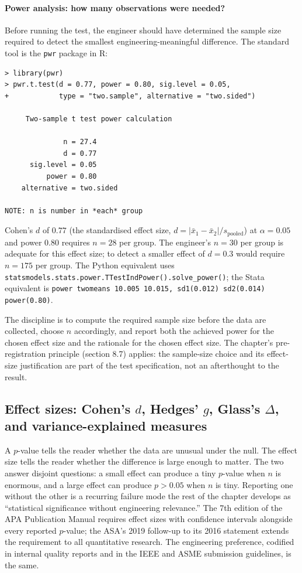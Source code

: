 \paragraph{Power analysis: how many observations were needed?}
Before running the test, the engineer should have determined the
sample size required to detect the smallest engineering-meaningful
difference. The standard tool is the \texttt{pwr} package in R:

\begin{verbatim}
> library(pwr)
> pwr.t.test(d = 0.77, power = 0.80, sig.level = 0.05,
+            type = "two.sample", alternative = "two.sided")

     Two-sample t test power calculation

              n = 27.4
              d = 0.77
      sig.level = 0.05
          power = 0.80
    alternative = two.sided

NOTE: n is number in *each* group
\end{verbatim}

\noindent
Cohen's $d$ of $0.77$ (the standardised effect size,
$d = |\bar{x}_{1} - \bar{x}_{2}|/s_{\text{pooled}}$) at $\alpha
= 0.05$ and power $0.80$ requires $n = 28$ per group. The
engineer's $n = 30$ per group is adequate for this effect size;
to detect a smaller effect of $d = 0.3$ would require $n = 175$
per group. The Python equivalent uses
\texttt{statsmodels.stats.power.TTestIndPower().solve\_power()};
the Stata equivalent is \texttt{power twomeans 10.005 10.015,
sd1(0.012) sd2(0.014) power(0.80)}.

The discipline is to compute the required sample size before
the data are collected, choose $n$ accordingly, and report both
the achieved power for the chosen effect size and the rationale
for the chosen effect size. The chapter's pre-registration
principle (section 8.7) applies: the sample-size choice and its
effect-size justification are part of the test specification,
not an afterthought to the result.

\subsection{Effect sizes: Cohen's \texorpdfstring{$d$}{d}, Hedges'
\texorpdfstring{$g$}{g}, Glass's \texorpdfstring{$\Delta$}{Delta},
and variance-explained measures}

A $p$-value tells the reader whether the data are unusual under the
null. The effect size tells the reader whether the difference is
large enough to matter. The two answer disjoint questions: a small
effect can produce a tiny $p$-value when $n$ is enormous, and a
large effect can produce $p > 0.05$ when $n$ is tiny. Reporting one
without the other is a recurring failure mode the rest of the
chapter develops as ``statistical significance without engineering
relevance.'' The 7th edition of the APA Publication Manual
\cite{text:ch08t3b-apa-2020} requires effect sizes with confidence
intervals alongside every reported $p$-value; the ASA's 2019
follow-up to its 2016 statement
\cite{paper:ch08t3-wasserstein-2019} extends the requirement to all
quantitative research. The engineering preference, codified in
internal quality reports and in the IEEE and ASME submission
guidelines, is the same.

